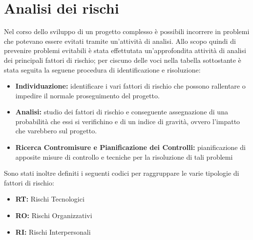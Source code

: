 \section{Analisi dei rischi}
Nel corso dello sviluppo di un progetto complesso è possibili incorrere in problemi che potevano essere evitati tramite un'attività di analisi. Allo scopo quindi di prevenire problemi evitabili è stata effettutata un'approfondita attività di analisi dei principali fattori di rischio; per ciscuno delle voci nella tabella sottostante è stata seguita la seguene procedura di identificazione e risoluzione: 
\begin{itemize}
	\item \textbf{Individuazione: }identificare i vari fattori di rischio che possono rallentare o impedire il normale proseguimento del progetto.
	\item \textbf{Analisi: }studio dei fattori di rischio e conseguente assegnazione di una probabilità che essi si verifichino e di un indice di gravità, ovvero l'impatto che varebbero sul progetto.
	\item \textbf{Ricerca Contromisure e Pianificazione dei Controlli: }pianificazione di apposite misure di controllo e tecniche per la risoluzione di tali problemi
\end{itemize}
Sono stati inoltre definiti i seguenti codici per raggruppare le varie tipologie di fattori di rischio:
\begin{itemize}
	\item \textbf{RT: }Rischi Tecnologici
	\item \textbf{RO: }Rischi Organizzativi
	\item \textbf{RI: }Rischi Interpersonali
\end{itemize}
